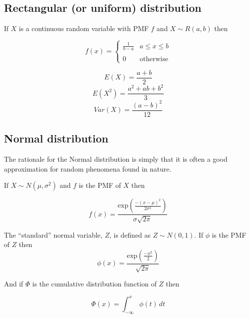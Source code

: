 \documentclass[a5paper]{article}
\begin{document}
\subsection{Rectangular (or uniform) distribution}

If $X$ is a continuous random variable with PMF $f$ and $X\sim R(a, b)$ then

\begin{equation}
  f(x) = \left\{
  \begin{array}{ll}
    \frac{1}{b-a} & a\le x\le b\\\\
    0 & \mbox{otherwise}
  \end{array}
  \right.
\end{equation}

\begin{equation}
  E(X) = \frac{a+b}{2}
\end{equation}
\begin{equation}
  E(X^2) = \frac{a^2+ab+b^2}{3}
\end{equation}
\begin{equation}
  Var(X) = \frac{(a-b)^2}{12}
\end{equation}

\subsection{Normal distribution}

The rationale for the Normal distribution is simply that it is often a good
approximation for random phenomena found in nature.

If $X \sim N(\mu,\sigma^2)$ and $f$ is the PMF of $X$ then

\begin{equation}
  f(x) = \frac{\mathrm{exp}\left(\frac{-(x-\mu)^2}{2\sigma^2}\right)}{\sigma\sqrt{2\pi}}
\end{equation}

The ``standard'' normal variable, $Z$, is defined as $Z\sim N(0,1)$. If $\phi$ is
the PMF of $Z$ then
\begin{equation}\label{eq:12}
  \phi(x) = \frac{\mathrm{exp}\left(\frac{-x^2}{2}\right)}{\sqrt{2\pi}}
\end{equation}

And if $\Phi$ is the cumulative distribution function of $Z$ then

\begin{equation}
  \Phi(x) = \int_{-\infty}^{x}\phi(t)\,dt
\end{equation}
\end{document}
